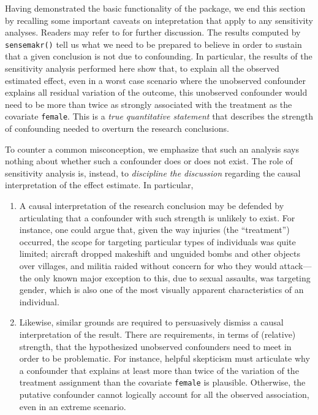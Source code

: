 \documentclass[
]{jss}
\begin{document}
Having demonstrated the basic functionality of the package, we end this
section by recalling some important caveats on intepretation that apply
to any sensitivity analyses. Readers may refer to
\citet{cinelli:jrssb2019} for further discussion. The results computed
by \texttt{sensemakr()} tell us what we need to be prepared to believe
in order to sustain that a given conclusion is not due to confounding.
In particular, the results of the sensitivity analysis performed here
show that, to explain all the observed estimated effect, even in a worst
case scenario where the unobserved confounder explains all residual
variation of the outcome, this unobserved confounder would need to be
more than twice as strongly associated with the treatment as the
covariate \texttt{female}. This is a \emph{true quantitative statement}
that describes the strength of confounding needed to overturn the
research conclusions.

To counter a common misconception, we emphasize that such an analysis
says nothing about whether such a confounder does or does not exist. The
role of sensitivity analysis is, instead, to \emph{discipline the
discussion} regarding the causal interpretation of the effect estimate.
In particular,

\begin{enumerate}
\def\labelenumi{\arabic{enumi}.}
\item
  A causal interpretation of the research conclusion may be defended by
  articulating that a confounder with such strength is unlikely to
  exist. For instance, one could argue that, given the way injuries (the
  ``treatment'') occurred, the scope for targeting particular types of
  individuals was quite limited; aircraft dropped makeshift and unguided
  bombs and other objects over villages, and militia raided without
  concern for who they would attack---the only known major exception to
  this, due to sexual assaults, was targeting gender, which is also one
  of the most visually apparent characteristics of an individual.
\item
  Likewise, similar grounds are required to persuasively dismiss a
  causal interpretation of the result. There are requirements, in terms
  of (relative) strength, that the hypothesized unobserved confounders
  need to meet in order to be problematic. For instance, helpful
  skepticism must articulate why a confounder that explains at least
  more than twice of the variation of the treatment assignment than the
  covariate \texttt{female} is plausible. Otherwise, the putative
  confounder cannot logically account for all the observed association,
  even in an extreme scenario.
\end{enumerate}
\end{document}
